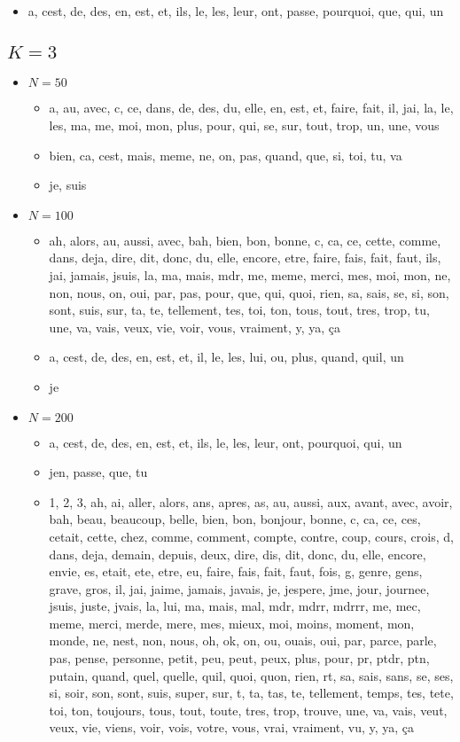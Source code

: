 \begin{itemize}
\begin{itemize}
 	\item a, cest, de, des, en, est, et, ils, le, les, leur, ont, passe, pourquoi, que, qui, un
 \end{itemize}
\end{itemize}
\subsection*{$K=3$}

\begin{itemize}
\item $N = 50$
	\begin{itemize}
	\item a, au, avec, c, ce, dans, de, des, du, elle, en, est, et, faire, fait, il, jai, la, le, les, ma, me, moi, mon, plus, pour, qui, se, sur, tout, trop, un, une, vous
	\item bien, ca, cest, mais, meme, ne, on, pas, quand, que, si, toi, tu, va
	\item je, suis
	\end{itemize}
\item $N = 100$
	\begin{itemize}
	\item ah, alors, au, aussi, avec, bah, bien, bon, bonne, c, ca, ce, cette, comme, dans, deja, dire, dit, donc, du, elle, encore, etre, faire, fais, fait, faut, ils, jai, jamais, jsuis, la, ma, mais, mdr, me, meme, merci, mes, moi, mon, ne, non, nous, on, oui, par, pas, pour, que, qui, quoi, rien, sa, sais, se, si, son, sont, suis, sur, ta, te, tellement, tes, toi, ton, tous, tout, tres, trop, tu, une, va, vais, veux, vie, voir, vous, vraiment, y, ya, ça
	\item a, cest, de, des, en, est, et, il, le, les, lui, ou, plus, quand, quil, un
	\item je
	\end{itemize}
\item $N = 200$
 \begin{itemize}
 	\item a, cest, de, des, en, est, et, ils, le, les, leur, ont, pourquoi, qui, un
 	\item jen, passe, que, tu
 	\item 1, 2, 3, ah, ai, aller, alors, ans, apres, as, au, aussi, aux, avant, avec, avoir, bah, beau, beaucoup, belle, bien, bon, bonjour, bonne, c, ca, ce, ces, cetait, cette, chez, comme, comment, compte, contre, coup, cours, crois, d, dans, deja, demain, depuis, deux, dire, dis, dit, donc, du, elle, encore, envie, es, etait, ete, etre, eu, faire, fais, fait, faut, fois, g, genre, gens, grave, gros, il, jai, jaime, jamais, javais, je, jespere, jme, jour, journee, jsuis, juste, jvais, la, lui, ma, mais, mal, mdr, mdrr, mdrrr, me, mec, meme, merci, merde, mere, mes, mieux, moi, moins, moment, mon, monde, ne, nest, non, nous, oh, ok, on, ou, ouais, oui, par, parce, parle, pas, pense, personne, petit, peu, peut, peux, plus, pour, pr, ptdr, ptn, putain, quand, quel, quelle, quil, quoi, quon, rien, rt, sa, sais, sans, se, ses, si, soir, son, sont, suis, super, sur, t, ta, tas, te, tellement, temps, tes, tete, toi, ton, toujours, tous, tout, toute, tres, trop, trouve, une, va, vais, veut, veux, vie, viens, voir, vois, votre, vous, vrai, vraiment, vu, y, ya, ça

\end{itemize}
\end{itemize}
